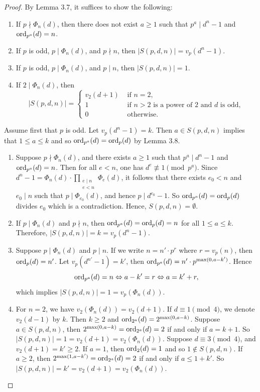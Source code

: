 \documentclass[10pt,leqno]{amsart}
\theoremstyle{definition}
\theoremstyle{remark}
\numberwithin{equation}{section}
\def\ord{{\rm ord}}
\begin{document}
\begin{proof}
    By Lemma 3.7, it suffices to show the following:
    \begin{enumerate}
        \item If $p\nmid \Phi_n(d)$, then there does not exist $a\geq 1$ such that $p^a\mid d^n-1$ and $\ord_{p^a}(d) = n$.
        \item If $p$ is odd, $p\mid \Phi_n(d)$, and $p\nmid n$, then $|S(p,d,n)| = v_p(d^n-1)$.
        \item If $p$ is odd, $p\mid \Phi_n(d)$, and $p\mid n$, then $|S(p,d,n)| = 1$.
        \item If $2\mid\Phi_n(d)$, then 
        $$|S(p,d,n)| = \begin{cases}
            v_2(d+1) &\text{ if }n = 2,\\
            1&\text{ if } n>2\text{ is a power of 2 and }d\text{ is odd},\\
            0&\text{ otherwise}.
        \end{cases}$$
    \end{enumerate}
    Assume first that $p$ is odd. Let $v_p(d^n-1) = k$. Then $a\in S(p,d,n)$ implies that $1\leq a\leq k$ and so $\ord_{p^a}(d) = \ord_p(d)$ by Lemma 3.8.
    \begin{enumerate}
        \item Suppose $p\nmid \Phi_n(d)$, and there exists $a\geq 1$ such that $p^a\mid d^n-1$ and $\ord_{p^a}(d) = n$. Then for all $e<n$, one has $d^e\not\equiv 1\pmod {p^a}$. Since $d^n-1 = \Phi_n(d)\cdot\prod_{\substack{e\mid n\\e<n}}\Phi_e(d)$, it follows that there exists $e_0<n$ and $e_0\mid n$ such that $p\mid \Phi_{e_0}(d)$, and hence $p\mid d^{e_0}-1$. So $\ord_{p^a}(d) = \ord_p(d)$ divides $e_0$ which is a contradiction. Hence, $S(p,d,n) = \emptyset$.
        \item If $p\mid \Phi_n(d)$ and $p\nmid n$, then $\ord_{p^a}(d) = \ord_p(d) = n$ for all $1\leq a\leq k$. Therefore, $|S(p,d,n)| = k = v_p(d^n-1)$.
        \item Suppose $p\mid \Phi_n(d)$ and $p\mid n$. If we write $n = n'\cdot p^r$ where $r = v_p(n)$, then $\ord_p(d) = n'$. Let $v_p(d^{n'}-1) = k'$, then $\ord_{p^a}(d) = n'\cdot p^{\max(0,a-k')}$. Hence
        $$\ord_{p^a}(d) = n\Leftrightarrow a-k' = r \Leftrightarrow a = k'+r,$$
        which implies $|S(p,d,n)| = 1 = v_p(\Phi_n(d))$.
        \item For $n = 2$, we have $v_2(\Phi_n(d)) = v_2(d+1)$. If $d\equiv 1\pmod 4$, we denote $v_2(d-1)$ by $k$. Then $k\geq 2$ and $\ord_{2^a}(d) = 2^{\max(0,a-k)}$. Suppose $a\in S(p,d,n)$, then $2^{\max(0,a-k)} = \ord_{2^a}(d) = 2$ if and only if $a = k+1$. So $|S(p,d,n)| = 1 = v_2(d+1) = v_2(\Phi_n(d))$. Suppose $d\equiv 3\pmod 4$, and $v_2(d+1) = k'\geq 2$. If $a = 1$, then $\ord_2(d) = 1$ and so $1\not\in S(p,d,n)$. If $a\geq 2$, then $2^{\max(1,a-k')} = \ord_{2^a}(d) = 2$ if and only if $a\leq 1+k'$. So $|S(p,d,n)| = k' = v_2(d+1) = v_2(\Phi_n(d))$.


\end{enumerate}
\end{proof}
\end{document}

